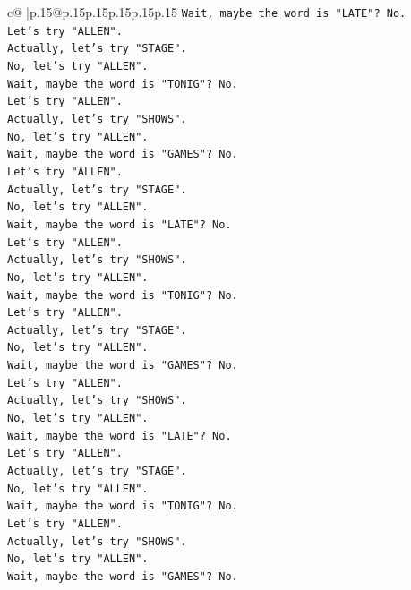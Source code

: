 \documentclass{article}
\begin{document}
{\begin{supertabular}{c@{$\;$}|p{.15\linewidth}@{}p{.15\linewidth}p{.15\linewidth}p{.15\linewidth}p{.15\linewidth}p{.15\linewidth}}
{{{\texttt{Wait, maybe the word is "LATE"? No.} \\
\texttt{Let's try "ALLEN".} \\
\texttt{Actually, let's try "STAGE".} \\
\texttt{No, let's try "ALLEN".} \\
\texttt{Wait, maybe the word is "TONIG"? No.} \\
\texttt{Let's try "ALLEN".} \\
\texttt{Actually, let's try "SHOWS".} \\
\texttt{No, let's try "ALLEN".} \\
\texttt{Wait, maybe the word is "GAMES"? No.} \\
\texttt{Let's try "ALLEN".} \\
\texttt{Actually, let's try "STAGE".} \\
\texttt{No, let's try "ALLEN".} \\
\texttt{Wait, maybe the word is "LATE"? No.} \\
\texttt{Let's try "ALLEN".} \\
\texttt{Actually, let's try "SHOWS".} \\
\texttt{No, let's try "ALLEN".} \\
\texttt{Wait, maybe the word is "TONIG"? No.} \\
\texttt{Let's try "ALLEN".} \\
\texttt{Actually, let's try "STAGE".} \\
\texttt{No, let's try "ALLEN".} \\
\texttt{Wait, maybe the word is "GAMES"? No.} \\
\texttt{Let's try "ALLEN".} \\
\texttt{Actually, let's try "SHOWS".} \\
\texttt{No, let's try "ALLEN".} \\
\texttt{Wait, maybe the word is "LATE"? No.} \\
\texttt{Let's try "ALLEN".} \\
\texttt{Actually, let's try "STAGE".} \\
\texttt{No, let's try "ALLEN".} \\
\texttt{Wait, maybe the word is "TONIG"? No.} \\
\texttt{Let's try "ALLEN".} \\
\texttt{Actually, let's try "SHOWS".} \\
\texttt{No, let's try "ALLEN".} \\
\texttt{Wait, maybe the word is "GAMES"? No.} \\
}}}
\end{supertabular}}
\end{document}
